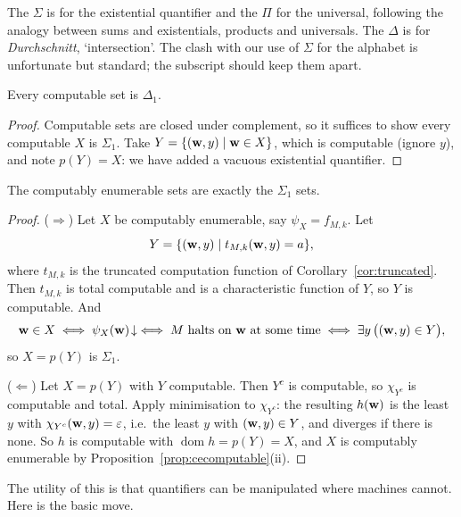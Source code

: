 \documentclass[a4paper]{scrartcl}
\newcommand{\dom}{\operatorname{dom}}
\newcommand{\eps}{\varepsilon}
\begin{document}
\begin{remark}
	The $\Sigma$ is for the existential quantifier and the $\Pi$ for the universal, following the analogy between sums and existentials, products and universals. The $\Delta$ is for \emph{Durchschnitt}, `intersection'. The clash with our use of $\Sigma$ for the alphabet is unfortunate but standard; the subscript should keep them apart.
\end{remark}

\begin{proposition}
	Every computable set is $\Delta_1$.
\end{proposition}

\begin{proof}
	Computable sets are closed under complement, so it suffices to show every computable $X$ is $\Sigma_1$. Take $Y = \{(\mathbf{w}, y) \mid \mathbf{w} \in X\}$, which is computable (ignore $y$), and note $p(Y) = X$: we have added a vacuous existential quantifier.
\end{proof}

\begin{theorem}\label{thm:cesigma1}
	The computably enumerable sets are exactly the $\Sigma_1$ sets.
\end{theorem}

\begin{proof}
	($\Rightarrow$) Let $X$ be computably enumerable, say $\psi_X = f_{M,k}$. Let
	$$Y = \{(\mathbf{w}, y) \mid t_{M,k}(\mathbf{w}, y) = a\},$$
	where $t_{M,k}$ is the truncated computation function of Corollary~\ref{cor:truncated}. Then $t_{M,k}$ is total computable and is a characteristic function of $Y$, so $Y$ is computable. And
	$$\mathbf{w} \in X \iff \psi_X(\mathbf{w})\!\downarrow \iff M \text{ halts on } \mathbf{w} \text{ at some time} \iff \exists y\, \big((\mathbf{w},y)\in Y\big),$$
	so $X = p(Y)$ is $\Sigma_1$.

	($\Leftarrow$) Let $X = p(Y)$ with $Y$ computable. Then $Y^c$ is computable, so $\chi_{Y^c}$ is computable and total. Apply minimisation to $\chi_{Y^c}$: the resulting $h(\mathbf{w})$ is the least $y$ with $\chi_{Y^c}(\vv w, y) = \eps$, i.e.\ the least $y$ with $(\mathbf{w}, y) \in Y$, and diverges if there is none. So $h$ is computable with $\dom h = p(Y) = X$, and $X$ is computably enumerable by Proposition~\ref{prop:cecomputable}(ii).
\end{proof}

The utility of this is that quantifiers can be manipulated where machines cannot. Here is the basic move.
\end{document}
